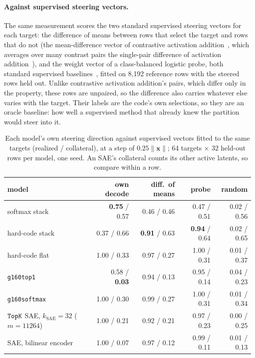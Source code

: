 \paragraph{Against supervised steering vectors.} The same measurement
scores the two standard supervised steering vectors for each target: the
difference of means between rows that select the target and rows that do
not (the mean-difference vector of contrastive activation
addition~\cite{rimsky2024}, which averages over many contrast pairs the
single-pair difference of activation addition~\cite{turner2024}), and the
weight vector of a class-balanced logistic probe, both standard supervised
baselines~\cite{wu2025axbenchsteeringllmssimple}, fitted on 8{,}192
reference rows with the steered rows held out. Unlike contrastive
activation addition's pairs, which differ only in the property, these rows
are unpaired, so the difference also carries whatever else varies with
the target. Their labels are the
code's own selections, so they are an oracle baseline: how well a
supervised method that already knew the partition would steer into it.

\begin{table}[htbp]\centering\small
\begin{tabular}{@{}lrrrr@{}}
\toprule
model & own decode & diff.\ of means & probe & random \\
\midrule
softmax stack & \textbf{0.75} / 0.57 & 0.46 / 0.46 & 0.47 / 0.51 & 0.02 / 0.56 \\
hard-code stack & 0.37 / 0.66 & \textbf{0.91} / 0.63 & \textbf{0.94} / 0.64 & 0.02 / 0.65 \\
hard-code flat & 1.00 / 0.33 & 0.97 / 0.27 & 1.00 / 0.31 & 0.01 / 0.37 \\
\texttt{g160top1} & 0.58 / \textbf{0.03} & 0.94 / 0.13 & 0.95 / 0.14 & 0.04 / 0.23 \\
\texttt{g160softmax} & 1.00 / 0.30 & 0.99 / 0.27 & 1.00 / 0.31 & 0.01 / 0.34 \\
$\mathop{\mathtt{TopK}}\limits$ SAE, $k_{\mathrm{SAE}}{=}32$ ($m{=}11264$) & 1.00 / 0.21 & 0.92 / 0.21 & 0.97 / 0.23 & 0.00 / 0.25 \\
SAE, bilinear encoder & 1.00 / 0.07 & 0.97 / 0.12 & 0.99 / 0.11 & 0.01 / 0.13 \\
\bottomrule
\end{tabular}
\caption{Each model's own steering direction against supervised vectors
fitted to the same targets (realized / collateral), at a step of
$0.25\lVert \mathbf{x}\rVert$; 64 targets $\times$ 32 held-out rows per
model, one seed. An SAE's collateral counts its other active latents, so
compare within a row.}
\label{tab:steersup}
\end{table}


